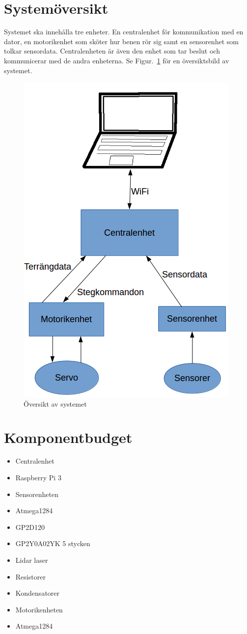 \documentclass[a4paper,titlepage,12pt]{article}
\begin{document}
	\section{Systemöversikt}
	Systemet ska innehålla tre enheter. En centralenhet för kommunikation med en
	dator, en motorikenhet som sköter hur benen rör sig samt en sensorenhet som
	tolkar sensordata. Centralenheten är även den enhet som tar beslut och
	kommunicerar med de andra enheterna. Se Figur.~\ref{fig:overview} för en översiktsbild av
	systemet.
	\begin{figure}[h]
		\centering
		\includegraphics[width=0.5\linewidth]{../images/overview.png}
		\caption{Översikt av systemet\label{fig:overview}}
	\end{figure}

	\section{Komponentbudget} 
    \begin{itemize}
	    \item Centralenhet 
	    \item Raspberry Pi 3 
	    \item Sensorenheten
	    \item Atmega1284 
	    \item GP2D120
	    \item GP2Y0A02YK 5 stycken
	    \item Lidar laser
	    \item Resistorer 
	    \item Kondensatorer 
	    \item Motorikenheten 
	    \item Atmega1284
    \end{itemize}
\end{document}
